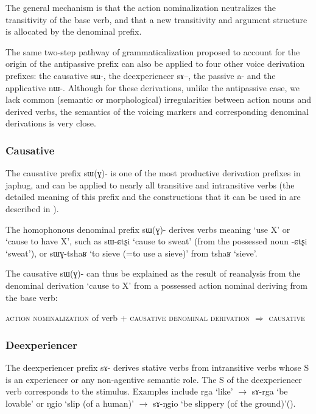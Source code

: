 \documentclass[oldfontcommands,oneside,a4paper,11pt]{article}
\newcommand{\ipa}[1]{\mbox{\phon #1}} %
\begin{document}
The general mechanism is that the action nominalization neutralizes the transitivity of the base verb, and that a new transitivity and argument structure is allocated by the denominal prefix.

 The same two-step pathway of grammaticalization proposed to account for the origin of the antipassive prefix can also be applied to four other voice derivation prefixes: the causative \ipa{sɯ-}, the deexperiencer \ipa{sɤ--}, the passive \ipa{a-} and the applicative \ipa{nɯ-}. Although for these derivations, unlike the antipassive case, we lack common (semantic or morphological) irregularities between action nouns and derived verbs, the semantics of the voicing markers and corresponding denominal derivations is very close.

\subsubsection{Causative}  \label{sec:causative}
The causative prefix \ipa{sɯ(ɣ)-} is one of the most productive derivation prefixes in japhug, and can be applied to nearly all transitive and intransitive verbs (the detailed meaning of this prefix and the constructions that it can be used in are described in \citealt{jacques15causative}). 

 The homophonous denominal prefix \ipa{sɯ(ɣ)-} derives verbs meaning `use X' or `cause to have X', such as \ipa{sɯ-ɕtʂi} `cause to sweat' (from the possessed noun \ipa{-ɕtʂi} `sweat'), or \ipa{sɯɣ-tshaʁ} `to sieve (=to use a sieve)' from \ipa{tshaʁ} `sieve'. 

The causative \ipa{sɯ(ɣ)-} can thus be explained as the result of reanalysis from the denominal derivation `cause to X' from a possessed action nominal deriving from the base verb:

\begin{exe}
\ex \label{ex:pathway2}
\glt \textsc{action nominalization} of verb + \textsc{causative denominal derivation} $\Rightarrow$ \textsc{causative}
\end{exe} 

 


\subsubsection{Deexperiencer} \label{sec:deexp}
 
 The deexperiencer prefix \ipa{sɤ-} derives stative verbs from intransitive verbs whose S is an experiencer or any non-agentive semantic role. The S of the deexperiencer verb corresponds to the stimulus. Examples include \ipa{rga} `like' $\rightarrow$ \ipa{sɤ-rga} `be lovable' or \ipa{ŋgio} `slip (of a human)' $\rightarrow$ \ipa{sɤ-ŋgio} `be slippery (of the ground)'(\citealt{jacques12demotion}).
\end{document}

